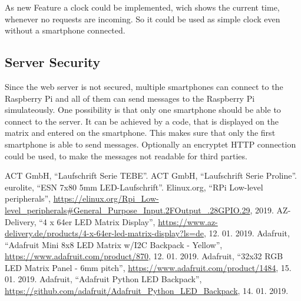 \documentclass[conference]{IEEEtran}
\begin{document}
As new Feature a clock could be implemented, wich shows the current time, whenever no requests are incoming. So it could be used as simple clock even without a smartphone connected.

\subsection{Server Security}
Since the web server is not secured, multiple smartphones can connect to the Raspberry Pi and all of them can send messages to the Raspberry Pi simulateously. One possibility is that only one smartphone should be able to connect to the server. It can be achieved by a code, that is displayed on the matrix and entered on the smartphone. This makes sure that only the first smartphone is able to send messages. Optionally an encryptet HTTP connection could be used, to make the messages not readable for third parties.


\begin{thebibliography}{00}
  ACT GmbH,
  ``Laufschrift Serie TEBE''.
  ACT GmbH,
  ``Laufschrift Serie Proline''.
  eurolite,
  ``ESN 7x80 5mm LED-Laufschrift''.
  Elinux.org,
  ``RPi Low-level peripherals'',
  \url{https://elinux.org/Rpi_Low-level_peripherals#General_Purpose_Input.2FOutput_.28GPIO.29},
  2019.
  AZ-Delivery,
  ``4 x 64er LED Matrix Display'',
  \url{https://www.az-delivery.de/products/4-x-64er-led-matrix-display?ls=de},
  12. 01. 2019.
  Adafruit,
  ``Adafruit Mini 8x8 LED Matrix w/I2C Backpack - Yellow'',
  \url{https://www.adafruit.com/product/870},
  12. 01. 2019.
  Adafruit,
  ``32x32 RGB LED Matrix Panel - 6mm pitch'',
  \url{https://www.adafruit.com/product/1484},
  15. 01. 2019.
  Adafruit,
  ``Adafruit Python LED Backpack'',
  \url{https://github.com/adafruit/Adafruit_Python_LED_Backpack},
  14. 01. 2019.
\end{thebibliography}
\end{document}
